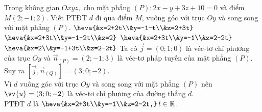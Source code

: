 \begin{ex}%
	Trong không gian $Oxyz,$ cho mặt phẳng $(P) \colon 2x-y+3z+10=0$ và điểm $M(2;-1;2)$. Viết PTĐT $d$ đi qua điểm $M$, vuông góc với trục $Oy$ và song song với mặt phẳng $(P)$.
	\choice
	{$\heva{&x=2+2t\\&y=-1-t\\&z=2+3t}$}
	{$\heva{&x=2+3t\\&y=-1-2t\\&z=2}$}
	{\True $\heva{&x=2+3t\\&y=-1\\&z=2-2t}$}
	{$\heva{&x=2\\&y=-1+3t\\&z=2-2t}$}
	\loigiai
	{
	Ta có $\vec{j}=(0;1;0)$ là véc-tơ chỉ phương của trục $Oy$ và $\vec{n}_{(P)}=(2;-1;3)$ là véc-tơ pháp tuyến của mặt phẳng $(P)$.\\
	Suy ra $\left[\vec{j},\vec{n}_{(Q)}\right]=(3;0;-2)$.\\
	Vì $d$ vuông góc với trục $Oy$ và song song với mặt phẳng $(P)$ nên $\vv{u}=(3;0;-2)$ là véc-tơ chỉ phương của đường thẳng $d$.\\
	PTĐT $d$ là $\heva{&x=2+3t\\&y=-1\\&z=2-2t,} \,t \in \mathbb{R}$.
	}
\end{ex}	
